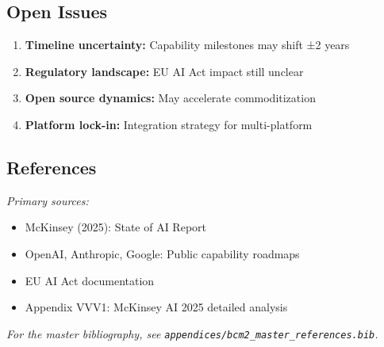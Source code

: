 
\subsection{Open Issues}

\begin{enumerate}
    \item \textbf{Timeline uncertainty:} Capability milestones may shift ±2 years
    \item \textbf{Regulatory landscape:} EU AI Act impact still unclear
    \item \textbf{Open source dynamics:} May accelerate commoditization
    \item \textbf{Platform lock-in:} Integration strategy for multi-platform
\end{enumerate}


\subsection{References}

\noindent\textit{Primary sources:}

\begin{itemize}[nosep]
    \item McKinsey (2025): State of AI Report
    \item OpenAI, Anthropic, Google: Public capability roadmaps
    \item EU AI Act documentation
    \item Appendix VVV1: McKinsey AI 2025 detailed analysis
\end{itemize}

\noindent\textit{For the master bibliography, see \texttt{appendices/bcm2\_master\_references.bib}.}

